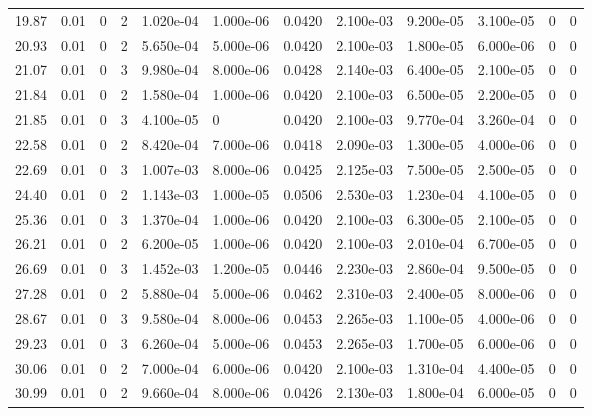 \documentclass[preview]{standalone}
\begin{document}
{{\begin{tabular}{L{1.2cm}C{1.2cm} C{0.3cm}C{0.5cm} C{1.4cm}C{1.4cm} C{1.4cm}C{1.4cm} C{1.6cm}C{1.6cm} C{1.6cm}C{1.6cm}}
  19.87  &  0.01  & 0     &  2 &  1.020e-04  & 1.000e-06  &  0.0420&   2.100e-03& 9.200e-05 & 3.100e-05   &  0 & 0  \\ 
  20.93  &  0.01  & 0     &  2 &  5.650e-04  & 5.000e-06  &  0.0420&   2.100e-03& 1.800e-05 & 6.000e-06   &  0 & 0  \\ 
  21.07  &  0.01  & 0     &  3 &  9.980e-04  & 8.000e-06  &  0.0428&   2.140e-03& 6.400e-05 & 2.100e-05   &  0 & 0  \\ 
  21.84  &  0.01  & 0     &  2 &  1.580e-04  & 1.000e-06  &  0.0420&   2.100e-03& 6.500e-05 & 2.200e-05   &  0 & 0  \\ 
  21.85  &  0.01  & 0     &  3 &  4.100e-05  & 0  &  0.0420&   2.100e-03& 9.770e-04 & 3.260e-04   &  0 & 0  \\ 
  22.58  &  0.01  & 0     &  2 &  8.420e-04  & 7.000e-06  &  0.0418&   2.090e-03& 1.300e-05 & 4.000e-06   &  0 & 0  \\ 
  22.69  &  0.01  & 0     &  3 &  1.007e-03  & 8.000e-06  &  0.0425&   2.125e-03& 7.500e-05 & 2.500e-05   &  0 & 0  \\ 
  24.40  &  0.01  & 0     &  2 &  1.143e-03  & 1.000e-05  &  0.0506&   2.530e-03& 1.230e-04 & 4.100e-05   &  0 & 0  \\ 
  25.36  &  0.01  & 0     &  3 &  1.370e-04  & 1.000e-06  &  0.0420&   2.100e-03& 6.300e-05 & 2.100e-05   &  0 & 0  \\ 
  26.21  &  0.01  & 0     &  2 &  6.200e-05  & 1.000e-06  &  0.0420&   2.100e-03& 2.010e-04 & 6.700e-05   &  0 & 0  \\ 
  26.69  &  0.01  & 0     &  3 &  1.452e-03  & 1.200e-05  &  0.0446&   2.230e-03& 2.860e-04 & 9.500e-05   &  0 & 0  \\ 
  27.28  &  0.01  & 0     &  2 &  5.880e-04  & 5.000e-06  &  0.0462&   2.310e-03& 2.400e-05 & 8.000e-06   &  0 & 0  \\ 
  28.67  &  0.01  & 0     &  3 &  9.580e-04  & 8.000e-06  &  0.0453&   2.265e-03& 1.100e-05 & 4.000e-06   &  0 & 0  \\ 
  29.23  &  0.01  & 0     &  3 &  6.260e-04  & 5.000e-06  &  0.0453&   2.265e-03& 1.700e-05 & 6.000e-06   &  0 & 0  \\ 
  30.06  &  0.01  & 0     &  2 &  7.000e-04  & 6.000e-06  &  0.0420&   2.100e-03& 1.310e-04 & 4.400e-05   &  0 & 0  \\ 
  30.99  &  0.01  & 0     &  2 &  9.660e-04  & 8.000e-06  &  0.0426&   2.130e-03& 1.800e-04 & 6.000e-05   &  0 & 0  \\ 
\hline 
\end{tabular} 

}}
\end{document}
